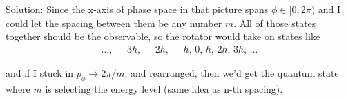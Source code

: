 \begin{homeworkProblem}
\begin{callout}{Solution:}
    Since the x-axis of phase space in that picture spans $\phi \in [0,2\pi)$ and I could let the spacing between them be any number $m$. All of those states together should be the observable, so the rotator would take on states like 
    \begin{align*}
        \dots,\, -3h,\, -2h,\, -h,\, 0,\, h,\, 2h,\, 3h,\, \dots
    \end{align*}

    and if I stuck in $p_\phi \to 2\pi / m$, and rearranged, then we'd get the quantum state where $m$ is selecting the energy level (same idea as n-th spacing).

    \end{callout}

\end{homeworkProblem}

\newpage
